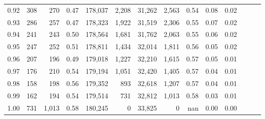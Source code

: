 \begin{tabular}{rrrrrrrrrrrrrr}
0.92 &    308 &    270 &  0.47 &  178,037 &    2,208 &  31,262 &   2,563 &  0.54 &  0.08 &      0.02 \\
0.93 &    286 &    257 &  0.47 &  178,323 &    1,922 &  31,519 &   2,306 &  0.55 &  0.07 &      0.02 \\
0.94 &    241 &    243 &  0.50 &  178,564 &    1,681 &  31,762 &   2,063 &  0.55 &  0.06 &      0.02 \\
0.95 &    247 &    252 &  0.51 &  178,811 &    1,434 &  32,014 &   1,811 &  0.56 &  0.05 &      0.02 \\
0.96 &    207 &    196 &  0.49 &  179,018 &    1,227 &  32,210 &   1,615 &  0.57 &  0.05 &      0.01 \\
0.97 &    176 &    210 &  0.54 &  179,194 &    1,051 &  32,420 &   1,405 &  0.57 &  0.04 &      0.01 \\
0.98 &    158 &    198 &  0.56 &  179,352 &      893 &  32,618 &   1,207 &  0.57 &  0.04 &      0.01 \\
0.99 &    162 &    194 &  0.54 &  179,514 &      731 &  32,812 &   1,013 &  0.58 &  0.03 &      0.01 \\
1.00 &    731 &  1,013 &  0.58 &  180,245 &        0 &  33,825 &       0 &   nan &  0.00 &      0.00 \\
\bottomrule
\end{tabular}
